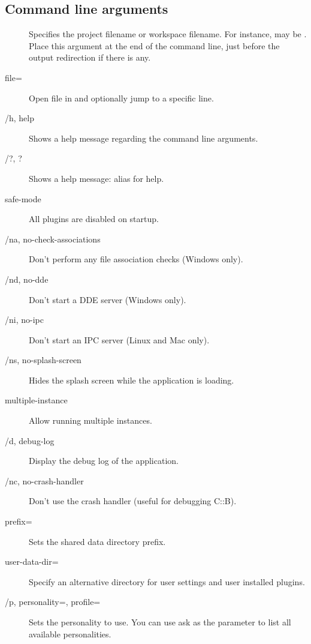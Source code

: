 \else
\begin{samepage}
\subsection{Command line arguments}
\begin{description}
\item[] Specifies the project  filename or workspace  filename. For instance,  may be . Place this argument at the end of the command line, just before the output redirection if there is any.
\end{description}
\end{samepage}
\begin{description}
\item[\opt{--}file=] Open file in \codeblocks and optionally jump to a specific line.
\item[/h, \opt{--}help] Shows a help message regarding the command line arguments.
\item[/?, \opt{--}?] Shows a help message: alias for help.
\item[\opt{--}safe-mode] All plugins are disabled on startup.
\item[/na, \opt{--}no-check-associations] Don't perform any file association checks (Windows only).
\item[/nd, \opt{--}no-dde] Don't start a DDE server (Windows only).
\item[/ni, \opt{--}no-ipc] Don't start an IPC server (Linux and Mac only).
\item[/ns, \opt{--}no-splash-screen] Hides the splash screen while the application is loading.
\item[\opt{--}multiple-instance] Allow running multiple instances.
\item[/d, \opt{--}debug-log] Display the debug log of the application.
\item[/nc, \opt{--}no-crash-handler] Don't use the crash handler (useful for debugging C::B).
\item[\opt{--}prefix=] Sets the shared data directory prefix.
\item[\opt{--}user-data-dir=] Specify an alternative directory for user settings and user installed plugins. 
\item[/p, \opt{--}personality=, \opt{--}profile=] Sets the personality to use. You can use ask as the parameter to list all available personalities.

\end{description}
